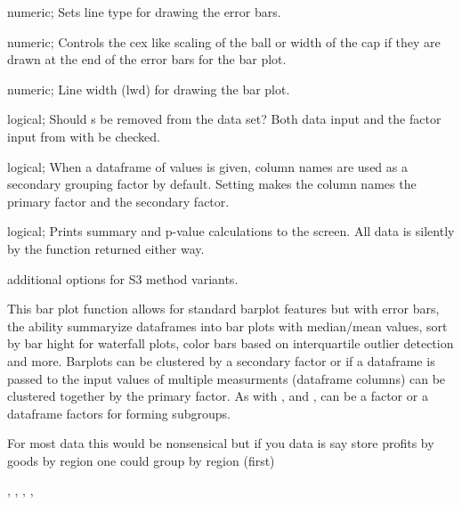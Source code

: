 \documentclass[a4paper]{book}
\begin{document}
\begin{Arguments}
\begin{ldescription}
\item[\code{errorLineType}] numeric; Sets  line type for drawing the error bars.

\item[\code{capSize}] numeric; Controls the cex like scaling of the ball or width of the cap if they are drawn at the end of the error bars for the bar plot.

\item[\code{lWidth}] numeric; Line width (lwd) for drawing the bar plot.

\item[\code{na.rm}] logical; Should s be removed from the data set? Both data input and the factor input from  with be checked.

\item[\code{flipFacts}] logical; When a dataframe of values is given, column names are used as a secondary grouping factor by default. Setting  makes the column names the primary factor and  the secondary factor.

\item[\code{verbose}] logical; Prints summary and p-value calculations to the screen. All data is silently by the function returned either way.

\item[\code{...}] additional options for S3 method variants.
\end{ldescription}
\end{Arguments}
%
\begin{Details}\relax
This bar plot function allows for standard barplot features but with error bars, the ability
summaryize dataframes into bar plots with median/mean values, sort by bar hight for waterfall plots,
color bars based on interquartile outlier detection and more. Barplots can be clustered by a secondary factor
or if a dataframe is passed to  the input values of multiple measurments (dataframe columns) can be
clustered together by the primary factor. As with , 
and ,  can be a factor or a dataframe factors for forming subgroups.

For most data this would be nonsensical but if you data is say store profits by goods by region one could group by region (first)
\end{Details}
%
\begin{SeeAlso}\relax
{}, , , , 
\end{SeeAlso}
\end{document}
